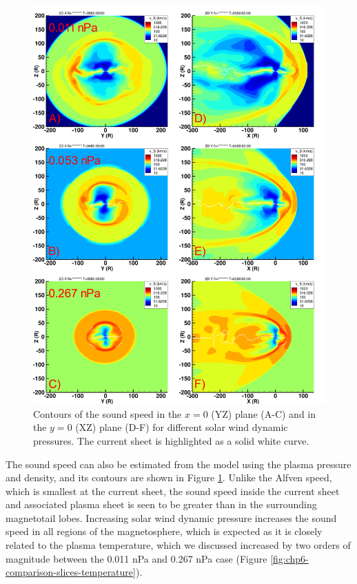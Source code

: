 \begin{figure}
    \centering
    \includegraphics[height=0.9\textheight]{images6/compare_runs_currentsheet_SoundSpeed.png}
    \caption{Contours of the sound speed in the $x=0$ (YZ) plane (A-C) and in the $y=0$ (XZ) plane (D-F) for different solar wind dynamic pressures. The current sheet is highlighted as a solid white curve.}
    \label{fig:chp6-comparison-slices-sound}
\end{figure}

The sound speed can also be estimated from the model using the plasma pressure and density, and its contours are shown in Figure \ref{fig:chp6-comparison-slices-sound}. Unlike the Alfven speed, which is smallest at the current sheet, the sound speed inside the current sheet and associated plasma sheet is seen to be greater than in the surrounding magnetotail lobes. Increasing solar wind dynamic pressure increases the sound speed in all regions of the magnetosphere, which is expected as it is closely related to the plasma temperature, which we discussed increased by two orders of magnitude between the 0.011 nPa and 0.267 nPa case (Figure \ref{fig:chp6-comparison-slices-temperature}). 

